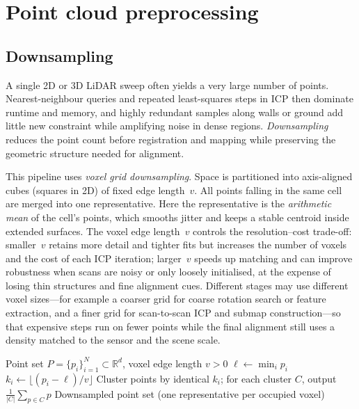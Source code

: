 \documentclass[11pt,a4paper]{article}
\begin{document}
\section{Point cloud preprocessing}

\subsection*{Downsampling}

A single 2D or 3D LiDAR sweep often yields a very large number of points. Nearest-neighbour queries and repeated least-squares steps in ICP then dominate runtime and memory, and highly redundant samples along walls or ground add little new constraint while amplifying noise in dense regions. \emph{Downsampling} reduces the point count before registration and mapping while preserving the geometric structure needed for alignment.

This pipeline uses \emph{voxel grid downsampling}. Space is partitioned into axis-aligned cubes (squares in 2D) of fixed edge length~$v$. All points falling in the same cell are merged into one representative. Here the representative is the \emph{arithmetic mean} of the cell's points, which smooths jitter and keeps a stable centroid inside extended surfaces. The voxel edge length~$v$ controls the resolution--cost trade-off: smaller~$v$ retains more detail and tighter fits but increases the number of voxels and the cost of each ICP iteration; larger~$v$ speeds up matching and can improve robustness when scans are noisy or only loosely initialised, at the expense of losing thin structures and fine alignment cues. Different stages may use different voxel sizes---for example a coarser grid for coarse rotation search or feature extraction, and a finer grid for scan-to-scan ICP and submap construction---so that expensive steps run on fewer points while the final alignment still uses a density matched to the sensor and the scene scale.

\begin{algorithm}
\caption{Voxel downsampling (mean per voxel)}
\begin{algorithmic}[1]
\Require Point set $P = \{p_i\}_{i=1}^N \subset \mathbb{R}^d$, voxel edge length $v > 0$
\State $\ell \gets \min_{i} p_i$ 
    \State $k_i \gets \lfloor (p_i - \ell) / v \rfloor$ 
\EndFor
\State Cluster points by identical $k_i$; for each cluster $C$, output $\frac{1}{|C|}\sum_{p \in C} p$
\Ensure Downsampled point set (one representative per occupied voxel)
\end{algorithmic}
\end{algorithm}
\end{document}
